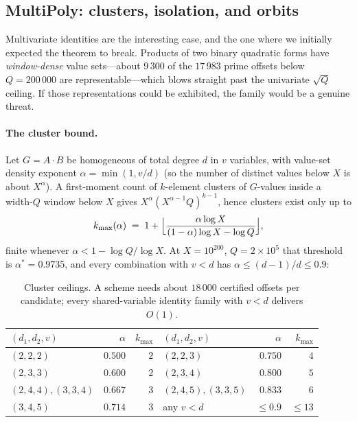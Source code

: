 \subsection{MultiPoly: clusters, isolation, and orbits}

Multivariate identities are the interesting case, and the one where we initially
expected the theorem to break. Products of two binary quadratic forms have
\emph{window-dense} value sets---about $9\,300$ of the $17\,983$ prime offsets
below $Q=200\,000$ are representable---which blows straight past the univariate
$\sqrt Q$ ceiling. If those representations could be exhibited, the family would
be a genuine threat.

\paragraph{The cluster bound.} Let $G=A\cdot B$ be homogeneous of total degree
$d$ in $v$ variables, with value-set density exponent $\alpha=\min(1,v/d)$
(so the number of distinct values below $X$ is about $X^{\alpha}$). A
first-moment count of $k$-element clusters of $G$-values inside a width-$Q$
window below $X$ gives $X^{\alpha}(X^{\alpha-1}Q)^{k-1}$, hence clusters exist
only up to
\[
k_{\max}(\alpha)\;=\;1+\Bigl\lfloor
\frac{\alpha\log X}{(1-\alpha)\log X-\log Q}\Bigr\rfloor ,
\]
finite whenever $\alpha<1-\log Q/\log X$. At $X=10^{200}$, $Q=2\times10^{5}$
that threshold is $\alpha^{*}=0.9735$, and every combination with $v<d$ has
$\alpha\le(d-1)/d\le0.9$:

\begin{table}[h]
\centering\small
\caption{Cluster ceilings. A scheme needs about $18\,000$ certified offsets per
candidate; every shared-variable identity family with $v<d$ delivers $O(1)$.}
\label{tab:kmax}
\begin{tabular}{lrr@{\qquad}lrr}
\toprule
$(d_1,d_2,v)$ & $\alpha$ & $k_{\max}$ & $(d_1,d_2,v)$ & $\alpha$ & $k_{\max}$\\
\midrule
$(2,2,2)$ & $0.500$ & $2$ & $(2,2,3)$ & $0.750$ & $4$\\
$(2,3,3)$ & $0.600$ & $2$ & $(2,3,4)$ & $0.800$ & $5$\\
$(2,4,4),(3,3,4)$ & $0.667$ & $3$ & $(2,4,5),(3,3,5)$ & $0.833$ & $6$\\
$(3,4,5)$ & $0.714$ & $3$ & any $v<d$ & $\le0.9$ & $\le13$\\
\bottomrule
\end{tabular}
\end{table}

